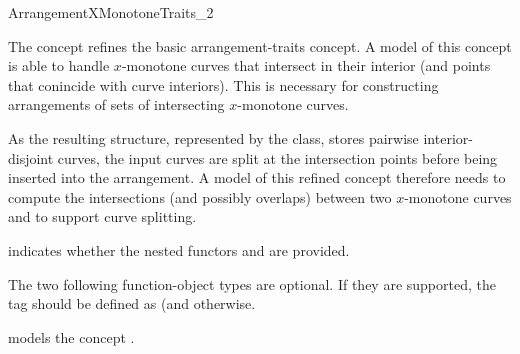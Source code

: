 
\ccRefPageBegin
\begin{ccRefConcept}{ArrangementXMonotoneTraits_2}

\ccThreeToTwo

\ccDefinition
The concept\ccRefName{} refines the basic arrangement-traits concept.
A model of this concept is able to handle $x$-monotone curves that
intersect in their interior (and points that conincide with curve
interiors). This is necessary for constructing arrangements of sets of
intersecting $x$-monotone curves.

As the resulting structure, represented by the  class,
stores pairwise interior-disjoint curves, the input curves are split at
the intersection points before being inserted into the arrangement. 
A model of this refined concept therefore needs to compute the intersections
(and possibly overlaps) between two $x$-monotone curves and to support
curve splitting.

\ccRefines
{}

\ccTypes

  {indicates whether the nested functors  and
   are provided.} 

\ccThreeToTwo
{}
\ccGlue
{}

The two following function-object types are optional. If they are
supported, the  tag should be defined as
 (and  otherwise.

%
  {models the concept .}
\ccGlue
{}

\ccThreeToTwo



\end{ccRefConcept}
